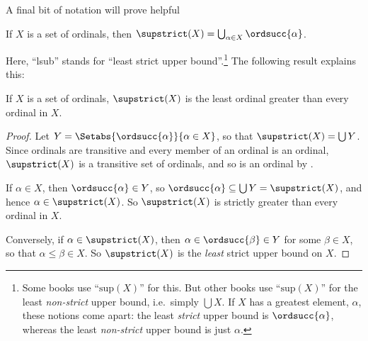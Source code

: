 \documentclass[../../../include/open-logic-section]{subfiles}
\begin{document}
A final bit of notation will prove helpful
\begin{defn}
	If $X$ is a  set of ordinals, then $\supstrict(X) = \bigcup_{\alpha \in X} \ordsucc{\alpha}$. 
\end{defn}\noindent
Here, ``lsub'' stands for ``least strict upper bound''.\footnote{Some books use ``$\text{sup}(X)$'' for this.  But other books use ``$\text{sup}(X)$'' for the least \emph{non-strict} upper bound, i.e.\ simply $\bigcup X$. If $X$ has a greatest element, $\alpha$, these notions come apart: the least \emph{strict} upper bound is $\ordsucc{\alpha}$, whereas the least \emph{non-strict} upper bound is just $\alpha$.}  The following result explains this:
\begin{prop}
	If $X$ is a set of ordinals, $\supstrict(X)$ is the least ordinal greater than every ordinal in $X$.
\end{prop}
\begin{proof}
	Let $Y = \Setabs{\ordsucc{\alpha}}{\alpha \in X}$, so that $\supstrict(X) = \bigcup Y$. Since ordinals are transitive and every member of an ordinal is an ordinal, $\supstrict(X)$ is a transitive set of ordinals, and so is an ordinal by . 
	
	If $\alpha \in X$, then $\ordsucc{\alpha} \in Y$, so $\ordsucc{\alpha} \subseteq \bigcup Y = \supstrict(X)$, and hence $\alpha \in \supstrict(X)$. So $\supstrict(X)$ is strictly greater than every ordinal in $X$.
	
	Conversely, if $\alpha \in \supstrict(X)$, then $\alpha \in \ordsucc{\beta} \in Y$ for some $\beta \in X$, so that $\alpha \leq \beta \in X$. So $\supstrict(X)$ is the \emph{least} strict upper bound on $X$.
\end{proof}
\end{document}
